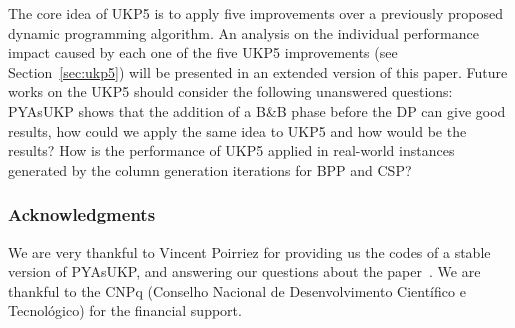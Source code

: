 \documentclass[runningheads,a4paper]{llncs}
\begin{document}
The core idea of UKP5 is to apply five improvements over a previously proposed dynamic programming algorithm.
An analysis on the individual performance impact caused by each one of the five UKP5 improvements (see Section~\ref{sec:ukp5}) will be presented in an extended version of this paper. 
Future works on the UKP5 should consider the following unanswered questions:
PYAsUKP shows that the addition of a B\&B phase before the DP can give good results, how could we apply the same idea to UKP5 and how would be the results?
How is the performance of UKP5 applied in real-world instances generated by the column generation iterations for BPP and CSP?

\subsubsection{Acknowledgments}

We are very thankful to Vincent Poirriez for providing us the codes of a stable version of PYAsUKP, and answering our questions about the paper~\cite{pya}. 
We are thankful to the CNPq (Conselho Nacional de Desenvolvimento Cient\'ifico e Tecnol\'ogico) for the financial support.

\end{document}
